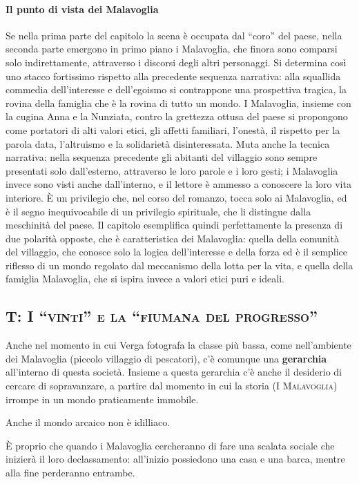 \documentclass{book}
\newcommand{\evidenziatore}[1]{\textbf{#1}}
\begin{document}
\paragraph{Il punto di vista dei Malavoglia} Se nella prima parte del capitolo la scena è occupata dal “coro” del paese, nella seconda parte emergono in primo piano i Malavoglia, che finora sono comparsi solo indirettamente, attraverso i discorsi degli altri personaggi. Si determina così uno stacco fortissimo rispetto alla precedente sequenza narrativa: alla squallida commedia dell'interesse e dell'egoismo si contrappone una prospettiva tragica, la rovina della famiglia che è la rovina di tutto un mondo. I Malavoglia, insieme con la cugina Anna e la Nunziata, contro la grettezza ottusa del paese si propongono come portatori di alti valori etici, gli affetti familiari, l'onestà, il rispetto per la parola data, l'altruismo e la solidarietà disinteressata. Muta anche la tecnica narrativa: nella sequenza precedente gli abitanti del villaggio sono sempre presentati solo dall'esterno, attraverso le loro parole e i loro gesti; i Malavoglia invece sono visti anche dall'interno, e il lettore è ammesso a conoscere la loro vita interiore. È un privilegio che, nel corso del romanzo, tocca solo ai Malavoglia, ed è il segno inequivocabile di un privilegio spirituale, che li distingue dalla meschinità del paese. Il capitolo esemplifica quindi perfettamente la presenza di due polarità opposte, che è caratteristica dei Malavoglia: quella della comunità del villaggio, che conosce solo la logica dell'interesse e della forza ed è il semplice riflesso di un mondo regolato dal meccanismo della lotta per la vita, e quella della famiglia Malavoglia, che si ispira invece a valori etici puri e ideali.

\subsection{T: \textsc{I ``vinti'' e la ``fiumana del progresso''}}

Anche nel momento in cui Verga fotografa la classe più bassa, come
nell'ambiente dei Malavoglia (piccolo villaggio di pescatori), c'è
comunque una \evidenziatore{gerarchia} all'interno di questa società.
Insieme a questa gerarchia c'è anche il desiderio di cercare di
sopravanzare, a partire dal momento in cui la storia (\textsc{I
Malavoglia}) irrompe in un mondo praticamente immobile.

Anche il mondo arcaico non è idilliaco.

È proprio che quando i Malavoglia cercheranno di fare una scalata
sociale che inizierà il loro declassamento: all'inizio possiedono una
casa e una barca, mentre alla fine perderanno entrambe.
\end{document}

